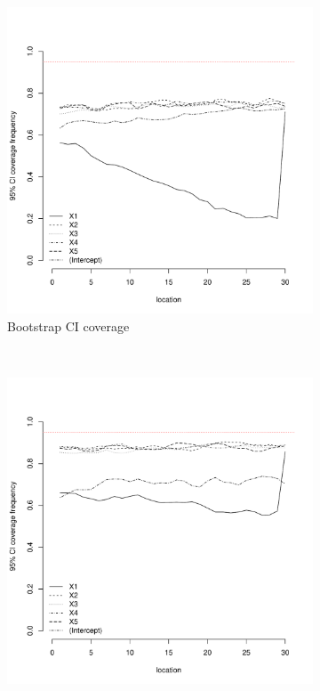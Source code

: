 \documentclass[authoryear, review, 11pt]{elsarticle}
\begin{document}
\begin{figure}
	\vspace{-30mm}
	\centering
	\begin{subfigure}[b]{0.45\textwidth}
	\centering
		\includegraphics[width=\textwidth]{../../figures/simulation/15.22.profile_bootstrap_coverage.pdf}
		\caption{Bootstrap CI coverage}
	\end{subfigure}%
	~ %
	\begin{subfigure}[b]{0.45\textwidth}
	\centering
		\includegraphics[width=\textwidth]{../../figures/simulation/15.22.profile_se_coverage.pdf}

\end{subfigure}
\end{figure}
\end{document}
